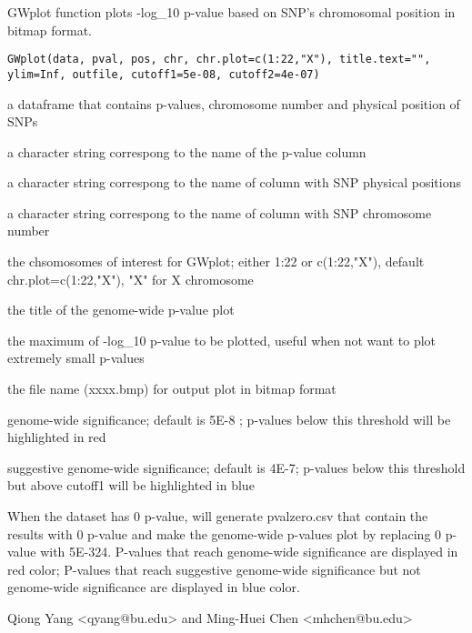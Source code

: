 \begin{Description}\relax
GWplot function plots -log_{10} p-value based on SNP's chromosomal position in bitmap format.
\end{Description}
\begin{Usage}
\begin{verbatim}
GWplot(data, pval, pos, chr, chr.plot=c(1:22,"X"), title.text="", 
ylim=Inf, outfile, cutoff1=5e-08, cutoff2=4e-07)
\end{verbatim}
\end{Usage}
\begin{Arguments}
\begin{ldescription}
\item[\code{data}] a dataframe that contains p-values, chromosome number and physical position of SNPs 
\item[\code{pval}] a character string correspong to the name of the p-value column 
\item[\code{pos}] a character string correspong to the name of column with SNP physical positions  
\item[\code{chr}] a character string correspong to the name of column with SNP chromosome number 
\item[\code{chr.plot}] the chsomosomes of interest for GWplot; either 1:22 or c(1:22,"X"), default chr.plot=c(1:22,"X"), "X" for X chromosome 
\item[\code{title.text}] the title of the genome-wide p-value plot 
\item[\code{ylim}] the maximum of -log_{10} p-value to be plotted, useful when not want to plot extremely small p-values 
\item[\code{outfile}] the file name (xxxx.bmp) for output plot in bitmap format 
\item[\code{cutoff1}] genome-wide significance; default is 5E-8 ; p-values below this threshold will be highlighted in red
\item[\code{cutoff2}] suggestive genome-wide significance; default is 4E-7; p-values below this threshold but above cutoff1 will be highlighted in blue 
\end{ldescription}
\end{Arguments}
\begin{Details}\relax
When the dataset has 0 p-value,  will generate pvalzero.csv that contain the results with 0 p-value and make the genome-wide p-values
plot by replacing 0 p-value with 5E-324. P-values that reach genome-wide significance are displayed in red color; P-values that reach 
suggestive genome-wide significance but not genome-wide significance are displayed in blue color.
\end{Details}
\begin{Author}\relax
Qiong Yang <qyang@bu.edu> and Ming-Huei Chen <mhchen@bu.edu>
\end{Author}

